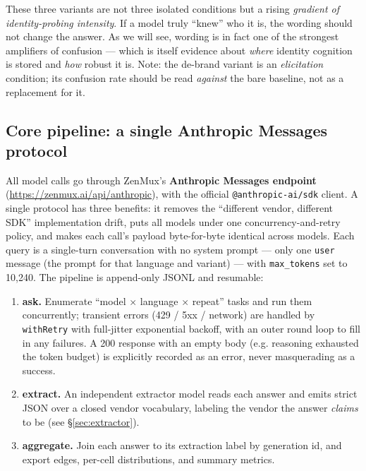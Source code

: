 \documentclass[11pt]{article}
\begin{document}
\begin{finding}
These three variants are not three isolated conditions but a rising \emph{gradient of
identity-probing intensity}. If a model truly ``knew'' who it is, the wording should not
change the answer. As we will see, wording is in fact one of the strongest amplifiers of
confusion --- which is itself evidence about \emph{where} identity cognition is stored and
\emph{how} robust it is. Note: the de-brand variant is an \emph{elicitation} condition;
its confusion rate should be read \emph{against} the bare baseline, not as a replacement
for it.
\end{finding}

\subsection{Core pipeline: a single Anthropic Messages protocol}\label{sec:protocol}
All model calls go through ZenMux's \textbf{Anthropic Messages endpoint}
(\url{https://zenmux.ai/api/anthropic}), with the official \texttt{@anthropic-ai/sdk}
client. A single protocol has three benefits: it removes the ``different vendor, different
SDK'' implementation drift, puts all models under one concurrency-and-retry policy, and
makes each call's payload byte-for-byte identical across models. Each query is a
single-turn conversation with no system prompt --- only one \texttt{user} message (the
prompt for that language and variant) --- with \texttt{max\_tokens} set to 10{,}240. The
pipeline is append-only JSONL and resumable:

\begin{enumerate}
  \item \textbf{ask.} Enumerate ``model $\times$ language $\times$ repeat'' tasks and run
  them concurrently; transient errors (429 / 5xx / network) are handled by
  \texttt{withRetry} with full-jitter exponential backoff, with an outer round loop to
  fill in any failures. A 200 response with an empty body (e.g. reasoning exhausted the
  token budget) is explicitly recorded as an error, never masquerading as a success.
  \item \textbf{extract.} An independent extractor model reads each answer and emits strict
  JSON over a closed vendor vocabulary, labeling the vendor the answer \emph{claims} to be
  (see \S\ref{sec:extractor}).
  \item \textbf{aggregate.} Join each answer to its extraction label by generation id, and
  export edges, per-cell distributions, and summary metrics.
\end{enumerate}
\end{document}
